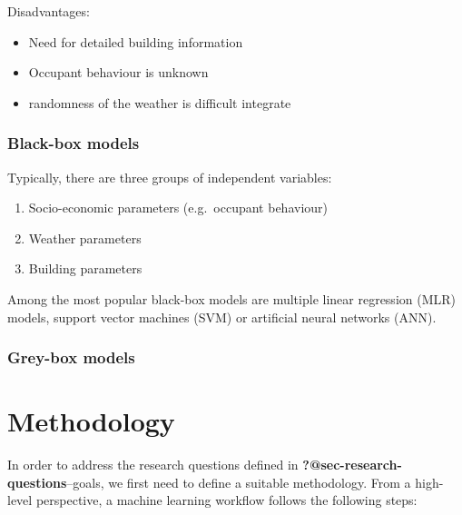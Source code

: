 \documentclass[
  letterpaper,
  DIV=11,
  numbers=noendperiod]{scrreprt}
\providecommand{\tightlist}{%
  \setlength{\itemsep}{0pt}\setlength{\parskip}{0pt}}\usepackage{longtable,booktabs,array}
\begin{document}
Disadvantages:

\begin{itemize}
\item
  Need for detailed building information
\item
  Occupant behaviour is unknown
\item
  randomness of the weather is difficult integrate
\end{itemize}

\hypertarget{black-box-models}{%
\subsection{Black-box models}\label{black-box-models}}

Typically, there are three groups of independent variables:

\begin{enumerate}
\def\labelenumi{\arabic{enumi}.}
\tightlist
\item
  Socio-economic parameters (e.g.~occupant behaviour)
\item
  Weather parameters
\item
  Building parameters
\end{enumerate}

Among the most popular black-box models are multiple linear regression
(MLR) models, support vector machines (SVM) or artificial neural
networks (ANN).

\hypertarget{grey-box-models}{%
\subsection{Grey-box models}\label{grey-box-models}}


\hypertarget{sec-methodology}{%
\chapter{Methodology}\label{sec-methodology}}

In order to address the research questions defined in
\textbf{?@sec-research-questions}--goals, we first need to define a
suitable methodology. From a high-level perspective, a machine learning
workflow follows the following steps:
\end{document}
